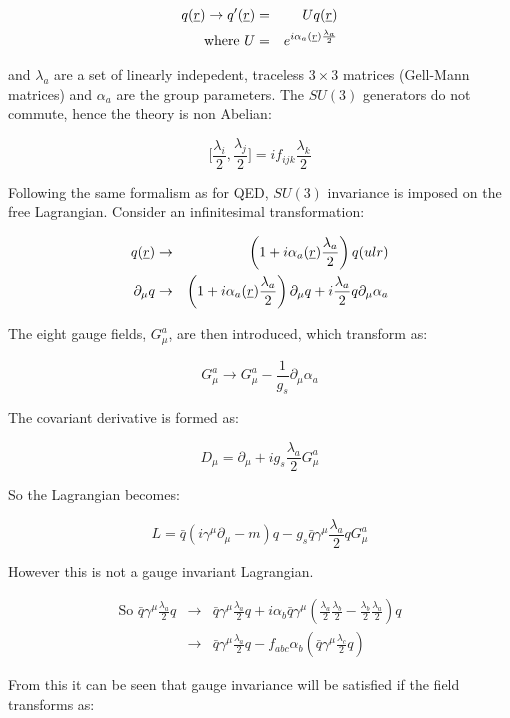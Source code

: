 \begin{eqnarray*}
  q(\underline{r}) \to q'(\underline{r}) & = & Uq(\underline{r}) \\
  \textrm{where } U & = & e^{i\alpha_a(\underline{r})\frac{\lambda_a}{2}}
\end{eqnarray*}

and $\lambda_a$ are a set of linearly indepedent, traceless $3 \times 3$ matrices (Gell-Mann matrices) and $\alpha_a$ are the group parameters.  The $SU(3)$ generators do not commute, hence the theory is non Abelian:

\[
  \Bigg[\frac{\lambda_i}{2},\frac{\lambda_j}{2}\Bigg] = if_{ijk}\frac{\lambda_k}{2}
\]

Following the same formalism as for QED, $SU(3)$ invariance is imposed on the free Lagrangian.  Consider an infinitesimal transformation:

\begin{eqnarray*}
  q(\underline{r}) & \to & \left(1 + i\alpha_a(\underline{r})\frac{\lambda_a}{2}\right)q(ul{r}) \\
  \partial_{\mu}q & \to & \left(1 + i\alpha_a(\underline{r})\frac{\lambda_a}{2}\right)\partial_{\mu}q + i\frac{\lambda_a}{2}q\partial_{\mu}\alpha_a
\end{eqnarray*}

The eight gauge fields, $G^a_{\mu}$, are then introduced, which transform as:

\[
  G^a_{\mu} \to G^a_{\mu} - \frac{1}{g_s}\partial_{\mu}\alpha_a
\]

The covariant derivative is formed as:

\[
  D_{\mu} = \partial_{\mu} + ig_s\frac{\lambda_a}{2}G^a_{\mu}
\]

So the Lagrangian becomes:

\[
  L = \bar{q}\left(i\gamma^{\mu}\partial_{\mu} - m\right)q - g_s\bar{q}\gamma^{\mu}\frac{\lambda_{a}}{2}qG^a_{\mu}
\]

However this is not a gauge invariant Lagrangian.

\begin{eqnarray*}
 \textrm{So } \bar{q}\gamma^{\mu}\frac{\lambda_a}{2}q & \to & \bar{q}\gamma^{\mu}\frac{\lambda_a}{2}q + i\alpha_b\bar{q}\gamma^{\mu}\left(\frac{\lambda_a}{2}\frac{\lambda_b}{2} - \frac{\lambda_b}{2}\frac{\lambda_a}{2}\right)q \\
  & \to & \bar{q}\gamma^{\mu}\frac{\lambda_a}{2}q - f_{abc}\alpha_b\left(\bar{q}\gamma^{\mu}\frac{\lambda_c}{2}q\right)
\end{eqnarray*}

From this it can be seen that gauge invariance will be satisfied if the field transforms as:

